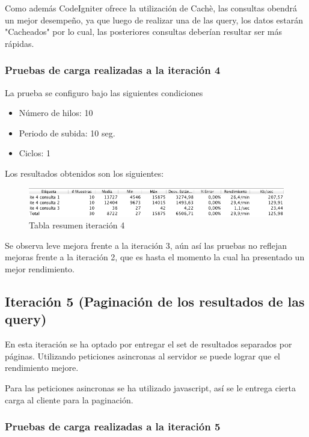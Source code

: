  Como además CodeIgniter ofrece la utilización de Cachè, las consultas obendrá un mejor desempeño, ya que luego de realizar una de las query, los datos estarán "Cacheados" por lo cual, las posteriores consultas deberían resultar ser más rápidas. 
 
 \subsubsection{Pruebas de carga realizadas a la iteración 4}
 
La prueba se configuro bajo las siguientes condiciones

\begin{itemize}
	\item Número de hilos: 10
	\item Periodo de subida: 10 seg.
	\item Ciclos: 1
\end{itemize}
 
Los resultados obtenidos son los siguientes:
 
 \begin{figure}[htb]
 	\label{Figura13}
 	\begin{center}
 		\includegraphics[scale=0.6]{imagenes/ite4.png}
 		\caption{Tabla resumen iteración 4}
 	\end{center}
 \end{figure}

 Se observa leve mejora frente a la iteración 3, aún así las pruebas no reflejan mejoras frente a la iteración 2, que es hasta el momento la cual ha presentado un mejor rendimiento.

 \newpage
 
\subsection{Iteración 5 (Paginación de los resultados de las query)}

En esta iteración se ha optado por entregar el set de resultados separados por páginas. Utilizando peticiones asincronas al servidor se puede lograr que el rendimiento mejore.

Para las peticiones asincronas se ha utilizado javascript, así se le entrega cierta carga al cliente para la paginación.

\subsubsection{Pruebas de carga realizadas a la iteración 5}

